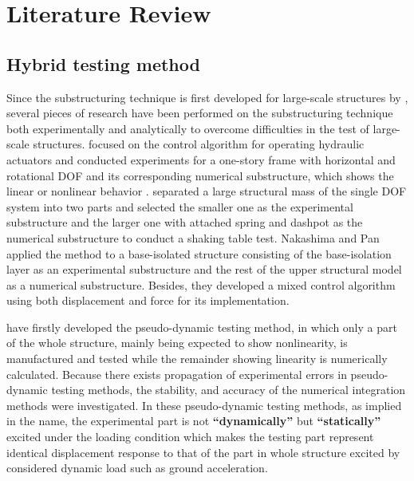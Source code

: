 \section{Literature Review}
\subsection{Hybrid testing method}

Since the substructuring technique is first developed for large-scale structures by \citet{nakashima1992development}, several pieces of research have been performed on the substructuring technique both experimentally and analytically to overcome difficulties in the test of large-scale structures. \citet{blakeborough2001development,darby2001improved} focused on the control algorithm for operating hydraulic actuators and conducted experiments for a one-story frame with horizontal and rotational DOF and its corresponding numerical substructure, which shows the linear or nonlinear behavior \citep{darby2002stability}. \citet{neild2005control} separated a large structural mass of the single DOF system into two parts and selected the smaller one as the experimental substructure and the larger one with attached spring and dashpot as the numerical substructure to conduct a shaking table test\citep{neild2005control}. Nakashima and Pan applied the method to a base-isolated structure consisting of the base-isolation layer as an experimental substructure and the rest of the upper structural model as a numerical substructure\citep{nakashima1999real}. Besides, they developed a mixed control algorithm using both displacement and force for its implementation\citep{pan2005online}.

\citet{takanashi1975nonlinear,takanashi1980inelastic} have firstly developed the pseudo-dynamic testing method, in which only a part of the whole structure, mainly being expected to show nonlinearity, is manufactured and tested while the remainder showing linearity is numerically calculated\citep{takanashi1975nonlinear,takanashi1980inelastic}. Because there exists propagation of experimental errors in pseudo-dynamic testing methods, the stability, and accuracy of the numerical integration methods were investigated\citep{shing1983experimental,shing1984pseudodynamic}. In these pseudo-dynamic testing methods, as implied in the name, the experimental part is not \textbf{``dynamically''} but \textbf{``statically''} excited under the loading condition which makes the testing part represent identical displacement response to that of the part in whole structure excited by considered dynamic load such as ground acceleration.

